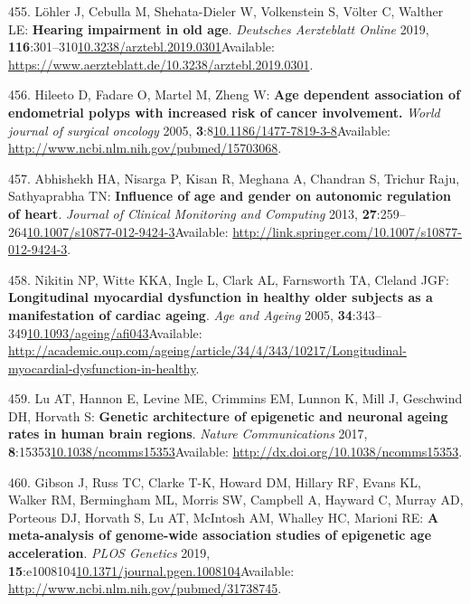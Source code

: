 \documentclass[
]{book}
\begin{document}
\leavevmode\hypertarget{ref-Lohler2019}{}%
455. Löhler J, Cebulla M, Shehata-Dieler W, Volkenstein S, Völter C, Walther LE: \textbf{Hearing impairment in old age}. \emph{Deutsches Aerzteblatt Online} 2019, \textbf{116}:301--310\href{https://doi.org/10.3238/arztebl.2019.0301}{10.3238/arztebl.2019.0301}Available: \url{https://www.aerzteblatt.de/10.3238/arztebl.2019.0301}.

\leavevmode\hypertarget{ref-Hileeto2005}{}%
456. Hileeto D, Fadare O, Martel M, Zheng W: \textbf{Age dependent association of endometrial polyps with increased risk of cancer involvement.} \emph{World journal of surgical oncology} 2005, \textbf{3}:8\href{https://doi.org/10.1186/1477-7819-3-8}{10.1186/1477-7819-3-8}Available: \url{http://www.ncbi.nlm.nih.gov/pubmed/15703068}.

\leavevmode\hypertarget{ref-Abhishekh2013}{}%
457. Abhishekh HA, Nisarga P, Kisan R, Meghana A, Chandran S, Trichur Raju, Sathyaprabha TN: \textbf{Influence of age and gender on autonomic regulation of heart}. \emph{Journal of Clinical Monitoring and Computing} 2013, \textbf{27}:259--264\href{https://doi.org/10.1007/s10877-012-9424-3}{10.1007/s10877-012-9424-3}Available: \url{http://link.springer.com/10.1007/s10877-012-9424-3}.

\leavevmode\hypertarget{ref-Nikitin2005}{}%
458. Nikitin NP, Witte KKA, Ingle L, Clark AL, Farnsworth TA, Cleland JGF: \textbf{Longitudinal myocardial dysfunction in healthy older subjects as a manifestation of cardiac ageing}. \emph{Age and Ageing} 2005, \textbf{34}:343--349\href{https://doi.org/10.1093/ageing/afi043}{10.1093/ageing/afi043}Available: \url{http://academic.oup.com/ageing/article/34/4/343/10217/Longitudinal-myocardial-dysfunction-in-healthy}.

\leavevmode\hypertarget{ref-Lu2017}{}%
459. Lu AT, Hannon E, Levine ME, Crimmins EM, Lunnon K, Mill J, Geschwind DH, Horvath S: \textbf{Genetic architecture of epigenetic and neuronal ageing rates in human brain regions}. \emph{Nature Communications} 2017, \textbf{8}:15353\href{https://doi.org/10.1038/ncomms15353}{10.1038/ncomms15353}Available: \url{http://dx.doi.org/10.1038/ncomms15353}.

\leavevmode\hypertarget{ref-Gibson2019}{}%
460. Gibson J, Russ TC, Clarke T-K, Howard DM, Hillary RF, Evans KL, Walker RM, Bermingham ML, Morris SW, Campbell A, Hayward C, Murray AD, Porteous DJ, Horvath S, Lu AT, McIntosh AM, Whalley HC, Marioni RE: \textbf{A meta-analysis of genome-wide association studies of epigenetic age acceleration}. \emph{PLOS Genetics} 2019, \textbf{15}:e1008104\href{https://doi.org/10.1371/journal.pgen.1008104}{10.1371/journal.pgen.1008104}Available: \url{http://www.ncbi.nlm.nih.gov/pubmed/31738745}.
\end{document}
